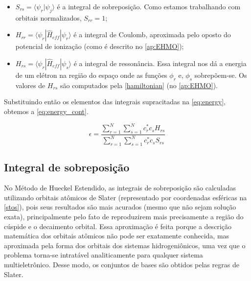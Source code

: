 \begin{itemize}
    \item $\displaystyle S_{rs} = \langle \psi_r | \psi_j \rangle$ é a integral de sobreposição. Como estamos trabalhando com orbitais normalizados, $S_{rr} = 1$;
    
    \item $\displaystyle H_{rr} = \langle \psi_r | \hat{H}_{eff} | \psi_r \rangle$ é a integral de Coulomb, aproximada pelo oposto do potencial de ionização (como é descrito no \autoref{ap:EHMO});
    
    \item $\displaystyle H_{rs} = \langle \psi_r | \hat{H}_{eff} | \psi_s \rangle$ é a integral de ressonância. Essa integral nos dá a energia de um elétron na região do espaço onde as funções $\phi_r$ e, $\phi_s$ sobrepõem-se. Os valores de $H_{rs}$ são computados pela \autoref{hamiltonian} (no \autoref{ap:EHMO}).
\end{itemize}

Substituindo então os elementos das integrais supracitadas na \autoref{eq:energy}, obtemos a \autoref{eq:energy_cont}.

\begin{equation}
\label{eq:energy_cont}
    \epsilon = \frac{\displaystyle \sum_{r=1}^{N} \sum_{s=1}^{N} c^*_r c_s H_{rs}}{\displaystyle \sum_{r=1}^{N} \sum_{s=1}^{N} c^*_r c_s S_{rs}}
\end{equation}

\subsection{Integral de sobreposição}

No Método de Hueckel Estendido, as integrais de sobreposição são calculadas utilizando orbitais atômicos de Slater (representado por coordenadas esféricas na \autoref{stos}), pois seus resultados são mais acurados (mesmo que não sejam solução exata), principalmente pelo fato de reproduzirem mais precisamente a região do cúspide e o decaimento orbital. Essa aproximação é feita porque a descrição matemática dos orbitais atômicos não pode ser exatamente conhecida, mas aproximada pela forma dos orbitais dos sistemas hidrogeniônicos, uma vez que o problema torna-se intratável analiticamente para qualquer sistema multieletrônico. Desse modo, os conjuntos de bases são obtidos pelas regras de Slater\autocite{Slater1930, Lu2006}.

